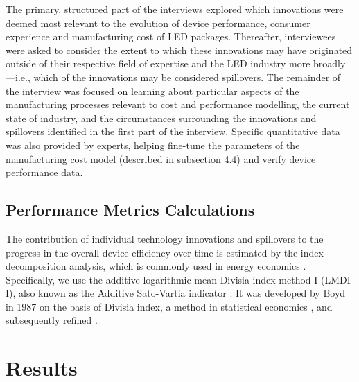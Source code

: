 \documentclass[twoside,twocolumn,9pt]{article}
\begin{document}
The primary, structured part of the interviews explored which innovations were deemed most relevant to the evolution of device performance, consumer experience and manufacturing cost of LED packages. Thereafter, interviewees were asked to consider the extent to which these innovations may have originated outside of their respective field of expertise and the LED industry more broadly—i.e., which of the innovations may be considered spillovers. The remainder of the interview was focused on learning about particular aspects of the manufacturing processes relevant to cost and performance modelling, the current state of industry, and the circumstances surrounding the innovations and spillovers identified in the first part of the interview. Specific quantitative data was also provided by experts, helping fine-tune the parameters of the manufacturing cost model (described in subsection 4.4) and verify device performance data.

\subsection{Performance Metrics Calculations}

The contribution of individual technology innovations and spillovers to the progress in the overall device efficiency over time is estimated by the index decomposition analysis, which is commonly used in energy economics \cite{Ang2019}. Specifically, we use the additive logarithmic mean Divisia index method I (LMDI-I), also known as the Additive Sato-Vartia indicator \cite{deBoer2019}. It was developed by Boyd in 1987 \cite{Boyd1987} on the basis of Divisia index, a method in statistical economics \cite{Diewert1988}, and subsequently refined \cite{Ang1997}.

\section{Results}
\end{document}
